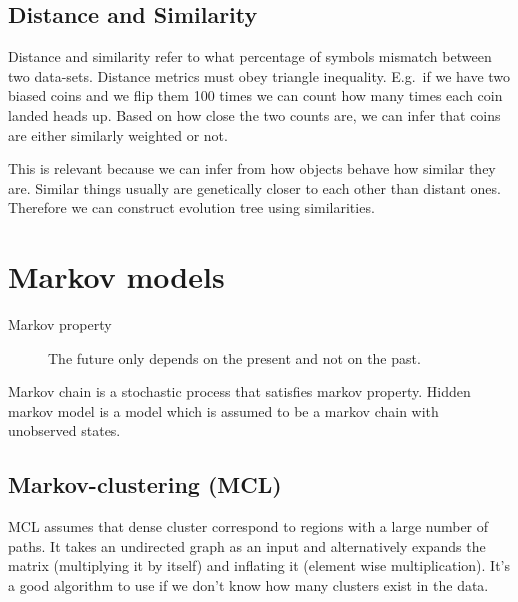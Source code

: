\documentclass[a5paper]{report}
\begin{document}
\subsection{Distance and Similarity}
Distance and similarity refer to what percentage of symbols mismatch between two data-sets.
Distance metrics must obey triangle inequality.
E.g.\ if we have two biased coins and we flip them 100 times we can count how many times each coin landed heads up.
Based on how close the two counts are, we can infer that coins are either similarly weighted or not.

This is relevant because we can infer from how objects behave how similar they are.
Similar things usually are genetically closer to each other than distant ones.
Therefore we can construct evolution tree using similarities.

\section{Markov models}
\begin{description}
\item[Markov property] The future only depends on the present and not on the past.
\end{description}
Markov chain is a stochastic process that satisfies markov property.
Hidden markov model is a model which is assumed to be a markov chain with unobserved states.
\subsection{Markov-clustering (MCL)}
MCL assumes that dense cluster correspond to regions with a large number of paths.
It takes an undirected graph as an input and alternatively expands the matrix (multiplying it by itself) and inflating it (element wise multiplication).
It's a good algorithm to use if we don't know how many clusters exist in the data.
\end{document}
